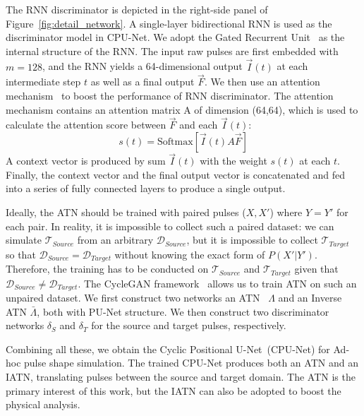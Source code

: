 The RNN discriminator is depicted in the right-side panel of Figure~\ref{fig:detail_network}. A single-layer bidirectional RNN is used as the discriminator model in CPU-Net. We adopt the Gated Recurrent Unit~\cite{GRU} as the internal structure of the RNN. The input raw pulses are first embedded with $m=128$, and the RNN yields a 64-dimensional output $\vec{I}(t)$ at each intermediate step $t$ as well as a final output  $\vec{F}$. We then use an attention mechanism~\cite{attention} to boost the performance of RNN discriminator. The attention mechanism contains an attention matrix A of dimension (64,64), which is used to calculate the attention score between $\vec{F}$ and each $\vec{I}(t)$:
\begin{equation}
    s(t) = \mathrm{Softmax}[\vec{I}(t) A \vec{F}]
\end{equation}
A context vector is produced by sum $\vec{I}(t)$ with the weight $s(t)$ at each $t$. Finally, the context vector and the final output vector is concatenated and fed into a series of fully connected layers to produce a single output.




Ideally, the ATN should be trained with paired pulses ($X, X'$) where $Y=Y'$ for each pair. In reality, it is impossible to collect such a paired dataset: we can simulate $\mathcal{T}_{Source}$ from an arbitrary $\mathcal{D}_{Source}$, but it is impossible to collect $\mathcal{T}_{Target}$ so that $\mathcal{D}_{Source} = \mathcal{D}_{Target}$ without knowing the exact form of $P(X'|Y')$. Therefore, the training has to be conducted on $\mathcal{T}_{Source}$ and $\mathcal{T}_{Target}$ given that $\mathcal{D}_{Source} \neq \mathcal{D}_{Target}$. The CycleGAN framework~\cite{CycleGAN} allows us to train ATN on such an unpaired dataset. We first construct two networks an ATN~ $\Lambda$ and an Inverse ATN $\bar{\Lambda}$, both with PU-Net structure. We then construct two discriminator networks $\delta_{S}$ and $\delta_{T}$ for the source and target pulses, respectively. 

Combining all these, we obtain the Cyclic Positional U-Net~(CPU-Net) for Ad-hoc pulse shape simulation. The trained CPU-Net produces both an ATN and an IATN, translating pulses between the source and target domain. The ATN is the primary interest of this work, but the IATN can also be adopted to boost the physical analysis.